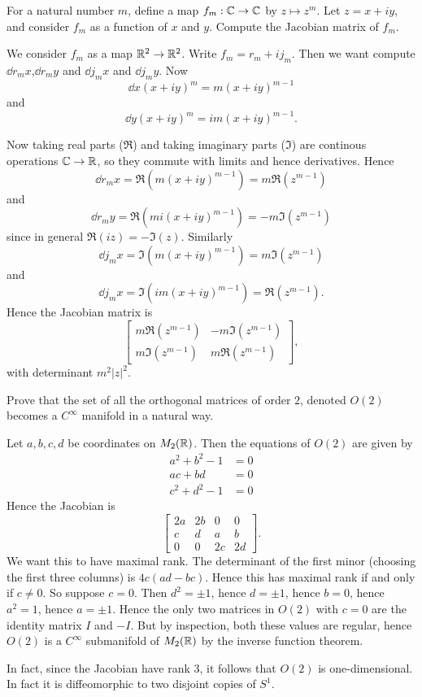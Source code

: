 \documentclass[11pt, english]{article}
\begin{document}
\begin{exc}[1.1] For a natural number $m$, define a map $f_m:\mathbb{C} \to \mathbb{C}$ by $z \mapsto z^m$. Let $z=x+iy$, and consider $f_m$ as a function of $x$ and $y$. Compute the Jacobian matrix of $f_m$.
\end{exc}
\begin{sol}
We consider $f_m$ as a map $\mathbb{R}^2 \to \mathbb{R}^2$. Write $f_m = r_m + i j_m$. Then we want compute $\dd{r_m}{x}$,$\dd{r_m}{y}$ and $\dd{j_m}{x}$ and $\dd{j_m}{y}$. Now
\[
\dd{}{x} \left( x+iy\right) ^m  = m (x+iy)^{m-1}
\]
and 
\[
\dd{}{y} (x+iy)^m = im(x+iy)^{m-1}.
\]

Now taking real parts ($\Re$) and taking imaginary parts ($\Im$) are continous operations $\mathbb{C} \to \mathbb{R}$, so they commute with limits and hence derivatives. Hence
\[
\dd{r_m}{x} = \Re \left( m(x+iy)^{m-1} \right) = m \Re(z^{m-1})
\]
and 
\[
\dd{r_m}{y} = \Re \left( mi(x+iy)^{m-1}  \right) = -m \Im(z^{m-1})
\]
since in general $\Re(iz)=-\Im(z)$. Similarly 
\[
\dd{j_m}{x} = \Im \left( m(x+iy)^{m-1} \right) = m \Im(z^{m-1})
\]
and 
\[
\dd{j_m}{x} = \Im \left( im(x+iy)^{m-1} \right) = \Re( z^{m-1}).
\]
Hence the Jacobian matrix is
\[
\begin{bmatrix}
m \Re(z^{m-1}) & -m\Im(z^{m-1}) \\
m \Im(z^{m-1}) & m\Re(z^{m-1})
\end{bmatrix},
\]
with determinant $m^2 \lvert z \rvert ^2$.
\end{sol}

\begin{exc}[1.2]
Prove that the set of all the orthogonal matrices of order $2$, denoted $O(2)$ becomes a $C^\infty$ manifold in a natural way.
\end{exc}
\begin{sol}
Let $a,b,c,d$ be coordinates on $M_2(\mathbb{R})$. Then the equations of $O(2)$ are given by
\begin{align*}
 a^2+b^2- 1 &= 0 \\
ac+bd &= 0 \\
c^2+d^2 -1&= 0
\end{align*}
Hence the Jacobian is
\[
\begin{bmatrix}
2a & 2b & 0 & 0 \\
c & d & a & b \\
0 & 0 & 2c & 2d
\end{bmatrix}.
\]
We want this to have maximal rank. The determinant of the first minor (choosing the first three columns) is $4c(ad-bc)$. Hence this has maximal rank if and only if $c \neq 0$. So suppose $c=0$. Then $d^2=\pm 1$, hence $d=\pm 1$, hence $b = 0$, hence $a^2=1$, hence $a= \pm 1$. Hence the only two matrices in $O(2)$ with $c=0$ are the identity matrix $I$ and $-I$. But by inspection, both these values are regular, hence $O(2)$ is a $C^\infty$ submanifold of $M_2(\mathbb{R})$ by the inverse function theorem.

In fact, since the Jacobian have rank 3, it follows that $O(2)$ is one-dimensional. In fact it is diffeomorphic to two disjoint copies of $S^1$.
\end{sol}
\end{document}
